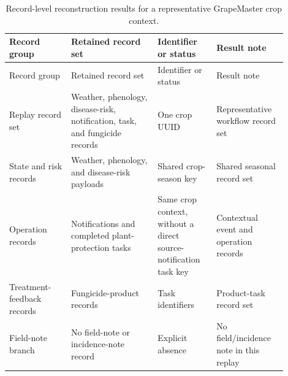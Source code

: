 \documentclass[12pt]{article}
\begin{document}
\begingroup
\setlength{\tabcolsep}{3pt}
\renewcommand{\arraystretch}{1.12}
\begin{longtable}{@{}L{0.20\linewidth} L{0.29\linewidth} L{0.19\linewidth} L{0.22\linewidth}@{}}
\caption{Record-level reconstruction results for a representative GrapeMaster crop context.}\label{tab:supp_crop_season_replay_audit}\\
\toprule
Record group & Retained record set & Identifier or status & Result note \\
\midrule
\endfirsthead
\toprule
Record group & Retained record set & Identifier or status & Result note \\
\midrule
\endhead
Replay record set & Weather, phenology, disease-risk, notification, task, and fungicide records & One crop UUID & Representative workflow record set \\
State and risk records & Weather, phenology, and disease-risk payloads & Shared crop-season key & Shared seasonal record set \\
Operation records & Notifications and completed plant-protection tasks & Same crop context, without a direct source-notification task key & Contextual event and operation records \\
Treatment-feedback records & Fungicide-product records & Task identifiers & Product-task record set \\
Field-note branch & No field-note or incidence-note record & Explicit absence & No field/incidence note in this replay \\
\bottomrule
\end{longtable}
\endgroup
\end{document}
